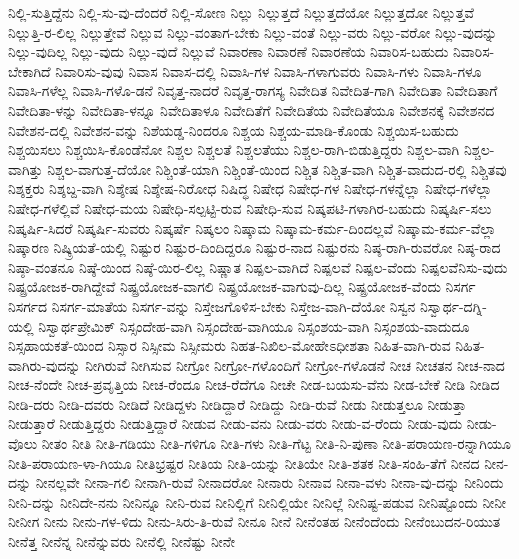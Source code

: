 {ನಿಲ್ಲಿ-ಸುತ್ತಿದ್ದೆನು
ನಿಲ್ಲಿ-ಸು-ವು-ದೆಂದರೆ
ನಿಲ್ಲಿ-ಸೋಣ
ನಿಲ್ಲು
ನಿಲ್ಲುತ್ತದೆ
ನಿಲ್ಲುತ್ತದೆಯೋ
ನಿಲ್ಲುತ್ತದೋ
ನಿಲ್ಲುತ್ತವೆ
ನಿಲ್ಲುತ್ತಿ-ರ-ಲಿಲ್ಲ
ನಿಲ್ಲುತ್ತೇವೆ
ನಿಲ್ಲುವ
ನಿಲ್ಲು-ವಂತಾಗ-ಬೇಕು
ನಿಲ್ಲು-ವಂತೆ
ನಿಲ್ಲು-ವರು
ನಿಲ್ಲು-ವರೋ
ನಿಲ್ಲು-ವುದನ್ನು
ನಿಲ್ಲು-ವುದಿಲ್ಲ
ನಿಲ್ಲು-ವುದು
ನಿಲ್ಲು-ವುದೆ
ನಿಲ್ಲುವೆ
ನಿವಾರಣಾ
ನಿವಾರಣೆ
ನಿವಾರಣೆಯ
ನಿವಾರಿಸ-ಬಹುದು
ನಿವಾರಿಸ-ಬೇಕಾಗಿದೆ
ನಿವಾರಿಸು-ವುವು
ನಿವಾಸ
ನಿವಾಸ-ದಲ್ಲಿ
ನಿವಾಸಿ-ಗಳ
ನಿವಾಸಿ-ಗಳಾಗುವರು
ನಿವಾಸಿ-ಗಳು
ನಿವಾಸಿ-ಗಳೂ
ನಿವಾಸಿ-ಗಳೆಲ್ಲ
ನಿವಾಸಿ-ಗಳೊ-ಡನೆ
ನಿವೃತ್ತ-ನಾದರೆ
ನಿವೃತ್ತ-ರಾಗಸ್ಯ
ನಿವೇದಿತ
ನಿವೇದಿತ-ಗಾಗಿ
ನಿವೇದಿತಾ
ನಿವೇದಿತಾಗೆ
ನಿವೇದಿತಾ-ಳನ್ನು
ನಿವೇದಿತಾ-ಳನ್ನೂ
ನಿವೇದಿತಾಳೂ
ನಿವೇದಿತೆಗೆ
ನಿವೇದಿತೆಯ
ನಿವೇದಿತೆಯೂ
ನಿವೇಶನಕ್ಕೆ
ನಿವೇಶನದ
ನಿವೇಶನ-ದಲ್ಲಿ
ನಿವೇಶನ-ವನ್ನು
ನಿಶೆಯಡ್ಡ-ನಿಂದರೂ
ನಿಶ್ಚಯ
ನಿಶ್ಚಯ-ಮಾಡಿ-ಕೊಂಡು
ನಿಶ್ಚಯಿಸ-ಬಹುದು
ನಿಶ್ಚಯಿಸಲು
ನಿಶ್ಚಯಿಸಿ-ಕೊಂಡೆನೋ
ನಿಶ್ಚಲ
ನಿಶ್ಚಲತೆ
ನಿಶ್ಚಲತೆಯು
ನಿಶ್ಚಲ-ರಾಗಿ-ಬಿಡುತ್ತಿದ್ದರು
ನಿಶ್ಚಲ-ವಾಗಿ
ನಿಶ್ಚಲ-ವಾಗಿತ್ತು
ನಿಶ್ಚಲ-ವಾಗುತ್ತ-ದೆಯೋ
ನಿಶ್ಚಿಂತೆ-ಯಾಗಿ
ನಿಶ್ಚಿಂತೆ-ಯಿಂದ
ನಿಶ್ಚಿತ
ನಿಶ್ಚಿತ-ವಾಗಿ
ನಿಶ್ಚಿತ-ವಾದುದ-ರಲ್ಲಿ
ನಿಶ್ಚಿತವು
ನಿಶ್ಶಕ್ತರು
ನಿಶ್ಶಬ್ದ-ವಾಗಿ
ನಿಶ್ಶೇಷ
ನಿಶ್ಶೇಷ-ನಿರೋಧ
ನಿಷಿದ್ಧ
ನಿಷೇಧ
ನಿಷೇಧ-ಗಳ
ನಿಷೇಧ-ಗಳನ್ನೆಲ್ಲಾ
ನಿಷೇಧ-ಗಳೆಲ್ಲಾ
ನಿಷೇಧ-ಗಳೆಲ್ಲಿವೆ
ನಿಷೇಧ-ಮಯ
ನಿಷೇಧಿ-ಸಲ್ಪಟ್ಟಿ-ರುವ
ನಿಷೇಧಿ-ಸುವ
ನಿಷ್ಕಪಟಿ-ಗಳಾಗಿರ-ಬಹುದು
ನಿಷ್ಕರ್ಷಿ-ಸಲು
ನಿಷ್ಕರ್ಷಿ-ಸಿದರೆ
ನಿಷ್ಕರ್ಷಿ-ಸುವರು
ನಿಷ್ಕರ್ಷೆ
ನಿಷ್ಕಲಂ
ನಿಷ್ಕಾಮ
ನಿಷ್ಕಾಮ-ಕರ್ಮ-ದಿಂದಲ್ಲವೆ
ನಿಷ್ಕಾಮ-ಕರ್ಮ-ವೆಲ್ಲಾ
ನಿಷ್ಕಾರಣ
ನಿಷ್ಕ್ರಿಯತೆ-ಯಲ್ಲಿ
ನಿಷ್ಟುರ
ನಿಷ್ಟುರ-ದಿಂದಿದ್ದರೂ
ನಿಷ್ಟುರ-ನಾದ
ನಿಷ್ಟುರನು
ನಿಷ್ಠ-ರಾಗಿ-ರುವರೋ
ನಿಷ್ಠ-ರಾದ
ನಿಷ್ಠಾ-ವಂತನೂ
ನಿಷ್ಠೆ-ಯಿಂದ
ನಿಷ್ಠೆ-ಯಿರ-ಲಿಲ್ಲ
ನಿಷ್ಣಾತ
ನಿಷ್ಪಲ-ವಾಗಿದೆ
ನಿಷ್ಪಲವೆ
ನಿಷ್ಪಲ-ವೆಂದು
ನಿಷ್ಪಲವೆನಿಸು-ವುದು
ನಿಷ್ಪ್ರಯೋಜಕ-ರಾಗಿದ್ದೇವೆ
ನಿಷ್ಪ್ರಯೋಜಕ-ವಾಗಲಿ
ನಿಷ್ಪ್ರಯೋಜಕ-ವಾಗುವು-ದಿಲ್ಲ
ನಿಷ್ಪ್ರಯೋಜಕ-ವೆಂದು
ನಿಸರ್ಗ
ನಿಸರ್ಗದ
ನಿಸರ್ಗ-ಮಾತೆಯ
ನಿಸರ್ಗ-ವನ್ನು
ನಿಸ್ತೇಜಗೊಳಿಸ-ಬೇಕು
ನಿಸ್ತೇಜ-ವಾಗಿ-ದೆಯೋ
ನಿಸ್ವನ
ನಿಸ್ವಾರ್ಥ-ದಗ್ನಿ-ಯಲ್ಲಿ
ನಿಸ್ವಾರ್ಥಪ್ರೇಮಿಕ್
ನಿಸ್ಸಂದೇಹ-ವಾಗಿ
ನಿಸ್ಸಂದೇಹ-ವಾಗಿಯೂ
ನಿಸ್ಸಂಶಯ-ವಾಗಿ
ನಿಸ್ಸಂಶಯ-ವಾದುದೂ
ನಿಸ್ಸಹಾಯಕತೆ-ಯಿಂದ
ನಿಸ್ಸಾರ
ನಿಸ್ಸೀಮ
ನಿಸ್ಸೀಮರು
ನಿಹತ-ನಿಖಿಲ-ಮೋಹೇಽಧೀಶತಾ
ನಿಹಿತ-ವಾಗಿ-ರುವ
ನಿಹಿತ-ವಾಗಿರು-ವುದನ್ನು
ನೀಗಿರುವೆ
ನೀಗಿಸುವ
ನೀಗ್ರೋ
ನೀಗ್ರೋ-ಗಳೊಂದಿಗೆ
ನೀಗ್ರೋ-ಗಳೊಡನೆ
ನೀಚ
ನೀಚತನ
ನೀಚ-ನಾದ
ನೀಚ-ನೆಂದೇ
ನೀಚ-ಪ್ರವೃತ್ತಿಯ
ನೀಚ-ರೆಂದೂ
ನೀಚ-ರೆದೆಗೂ
ನೀಚೇ
ನೀಡ-ಬಯಸು-ವೆನು
ನೀಡ-ಬೇಕೆ
ನೀಡಿ
ನೀಡಿದ
ನೀಡಿ-ದರು
ನೀಡಿ-ದವರು
ನೀಡಿದೆ
ನೀಡಿದ್ದಳು
ನೀಡಿದ್ದಾರೆ
ನೀಡಿದ್ದು
ನೀಡಿ-ರುವೆ
ನೀಡು
ನೀಡುತ್ತಲೂ
ನೀಡುತ್ತಾ
ನೀಡುತ್ತಾರೆ
ನೀಡುತ್ತಿದ್ದರು
ನೀಡುತ್ತಿದ್ದಾರೆ
ನೀಡುವ
ನೀಡು-ವನು
ನೀಡು-ವರು
ನೀಡು-ವ-ರೆಂದು
ನೀಡು-ವುದು
ನೀಡು-ವೊಲು
ನೀತಂ
ನೀತಿ
ನೀತಿ-ಗಡಿಯು
ನೀತಿ-ಗಳಿಗೂ
ನೀತಿ-ಗಳು
ನೀತಿ-ಗೆಟ್ಟ
ನೀತಿ-ನಿ-ಪುಣಾ
ನೀತಿ-ಪರಾಯಣ-ರನ್ನಾಗಿಯೂ
ನೀತಿ-ಪರಾಯಣ-ಳಾ-ಗಿಯೂ
ನೀತಿಭ್ರಷ್ಟರ
ನೀತಿಯ
ನೀತಿ-ಯನ್ನು
ನೀತಿಯೇ
ನೀತಿ-ಶತಕ
ನೀತಿ-ಸಂಹಿ-ತೆಗೆ
ನೀನದ
ನೀನ-ದನ್ನು
ನೀನಲ್ಲವೇ
ನೀನಾ-ಗಲಿ
ನೀನಾಗಿ-ರುವೆ
ನೀನಾದರೋ
ನೀನಾರು
ನೀನಾವ
ನೀನಾ-ವಳು
ನೀನಾ-ವು-ದನ್ನು
ನೀನಿಂದು
ನೀನಿ-ದನ್ನು
ನೀನಿದೇ-ನನು
ನೀನಿನ್ನೂ
ನೀನಿ-ರುವ
ನೀನಿಲ್ಲಿಗೆ
ನೀನಿಲ್ಲಿಯೇ
ನೀನಿಲ್ಲೆ
ನೀನಿಷ್ಟ-ಪಡುವ
ನೀನಿಷ್ಟೊಂದು
ನೀನೀ
ನೀನೀಗ
ನೀನು
ನೀನು-ಗಳ-ಳಿದು
ನೀನು-ಸಿರು-ತಿ-ರುವೆ
ನೀನೂ
ನೀನೆ
ನೀನೆಂತಹ
ನೀನೆಂದೆಂದು
ನೀನೆಂಬುದನ-ರಿಯುತ
ನೀನೆತ್ತ
ನೀನೆನ್ನ
ನೀನೆನ್ನುವರು
ನೀನೆಲ್ಲಿ
ನೀನೆಷ್ಟು
ನೀನೇ
}
